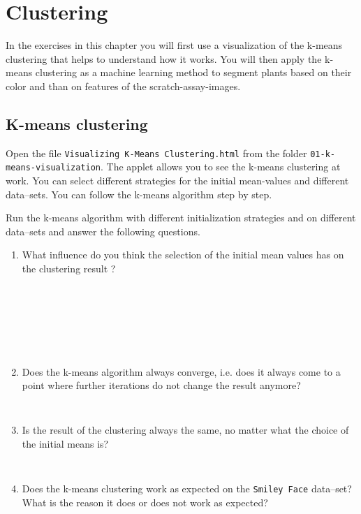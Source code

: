 \chapter{Clustering}

In the exercises in this chapter you will first use a visualization of the k-means clustering that helps to understand how it works. You will then apply the k-means clustering as a machine learning method to segment plants based on their color and than on features of the scratch-assay-images.

\section{K-means clustering}

Open the file {\tt Visualizing K-Means Clustering.html} from the folder {\tt 01-k-means-visualization}. The applet allows you to see the k-means clustering at work. You can select different strategies for the initial mean-values and different data--sets. You can follow the k-means algorithm step by step. 

Run the k-means algorithm with different initialization strategies and on different data--sets and answer the following questions.

\begin{enumerate}
\item What influence do you think the selection of the initial mean values has on the clustering result ?
\begin{verbatim}







\end{verbatim}
\item Does the k-means algorithm always converge, i.e. does it always come to a point where further iterations do not change the result anymore?
\begin{verbatim}


\end{verbatim}
\item Is the result of the clustering always the same, no matter what the choice of the initial means is?
\begin{verbatim}


\end{verbatim}
\item Does the k-means clustering work as expected on the {\tt Smiley Face} data--set? What is the reason it does or does not work as expected?
\begin{verbatim}









\end{verbatim}
\end{enumerate}


